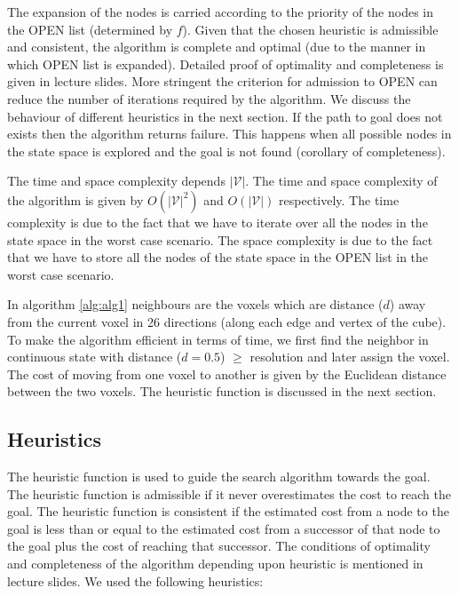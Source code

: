 \documentclass[conference]{IEEEtran}
\begin{document}
\par The expansion of the nodes is carried according to the priority of the nodes in the OPEN list (determined by $f$). Given that the chosen heuristic is admissible and consistent, the algorithm is complete and optimal (due to the manner in which OPEN list is expanded).
Detailed proof of optimality and completeness is given in lecture slides. More stringent the criterion for admission to OPEN can reduce the number of iterations required by the algorithm. We discuss the behaviour of different heuristics in the next section.
If the path to goal does not exists then the algorithm returns failure. This happens when all possible nodes in the state space is explored and the goal is not found (corollary of completeness).
\par The time and space complexity depends $|\mathcal{V}|$. The time and space complexity of the algorithm is given by $O(|\mathcal{V}|^2)$ and $O(|\mathcal{V}|)$ respectively. The time complexity is due to the fact that we have to iterate over all the nodes in the state space in the worst case scenario.
The space complexity is due to the fact that we have to store all the nodes of the state space in the OPEN list in the worst case scenario.
\par In algorithm \ref{alg:alg1} neighbours are the voxels which are distance ($d$) away from the current voxel in 26 directions (along each edge and vertex of the cube). To make the algorithm efficient in terms of time, we first find the neighbor in continuous state with distance ($d = 0.5$) $\geq$ resolution and later assign the voxel. The cost of moving from one voxel to another is given by the Euclidean distance between the two voxels. The heuristic function is discussed in the next section.
\subsection{Heuristics}
The heuristic function is used to guide the search algorithm towards the goal. The heuristic function is admissible if it never overestimates the cost to reach the goal. 
The heuristic function is consistent if the estimated cost from a node to the goal is less than or equal to the estimated cost from a successor of that node to the goal plus the cost of reaching that successor.
The conditions of optimality and completeness of the algorithm depending upon heuristic is mentioned in lecture slides. We used the following heuristics:
\end{document}
